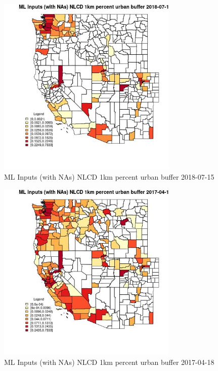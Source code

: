 \begin{figure} 
\centering  
\includegraphics[width=0.77\textwidth]{Code_Outputs/Report_ML_input_PM25_Step4_part_e_de_duplicated_aves_compiled_2019-05-21wNAs_CountyNLCD_1km_percent_urban_bufferMean2018-07-15.jpg} 
\caption{\label{fig:Report_ML_input_PM25_Step4_part_e_de_duplicated_aves_compiled_2019-05-21wNAsCountyNLCD_1km_percent_urban_bufferMean2018-07-15}ML Inputs (with NAs) NLCD 1km percent urban buffer 2018-07-15} 
\end{figure} 
 

\begin{figure} 
\centering  
\includegraphics[width=0.77\textwidth]{Code_Outputs/Report_ML_input_PM25_Step4_part_e_de_duplicated_aves_compiled_2019-05-21wNAs_CountyNLCD_1km_percent_urban_bufferMean2017-04-18.jpg} 
\caption{\label{fig:Report_ML_input_PM25_Step4_part_e_de_duplicated_aves_compiled_2019-05-21wNAsCountyNLCD_1km_percent_urban_bufferMean2017-04-18}ML Inputs (with NAs) NLCD 1km percent urban buffer 2017-04-18} 
\end{figure} 
 

